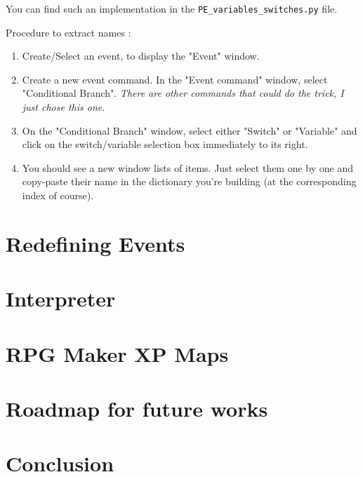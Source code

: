 \documentclass[11pt]{article}
\begin{document}
You can find such an implementation in the \verb|PE_variables_switches.py| file.

Procedure to extract names :
\begin{enumerate}
	\item Create/Select an event, to display the "Event" window.
	
	\item Create a new event command. In the "Event command" window, select "Conditional Branch". \textit{There are other commands that could do the trick, I just chose this one}.
	
	\item On the "Conditional Branch" window, select either "Switch" or "Variable" and click on the switch/variable selection box immediately to its right.
	
	\item You should see a new window lists of items. Just select them one by one and copy-paste their name in the dictionary you're building (at the corresponding index of course).
\end{enumerate}



\newpage 
\section{Redefining Events}




\newpage 
\section{Interpreter}



\newpage 
\section{RPG Maker XP Maps}



\newpage 
\section{Roadmap for future works}



\newpage 
\section{Conclusion}
\end{document}
